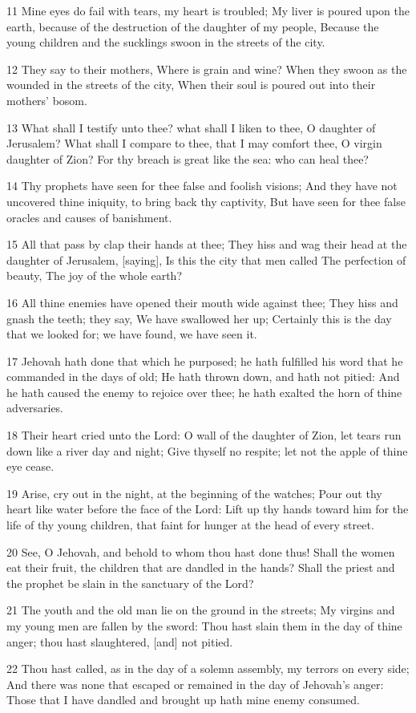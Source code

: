 \par 11 Mine eyes do fail with tears, my heart is troubled; My liver is poured upon the earth, because of the destruction of the daughter of my people, Because the young children and the sucklings swoon in the streets of the city.
\par 12 They say to their mothers, Where is grain and wine? When they swoon as the wounded in the streets of the city, When their soul is poured out into their mothers' bosom.
\par 13 What shall I testify unto thee? what shall I liken to thee, O daughter of Jerusalem? What shall I compare to thee, that I may comfort thee, O virgin daughter of Zion? For thy breach is great like the sea: who can heal thee?
\par 14 Thy prophets have seen for thee false and foolish visions; And they have not uncovered thine iniquity, to bring back thy captivity, But have seen for thee false oracles and causes of banishment.
\par 15 All that pass by clap their hands at thee; They hiss and wag their head at the daughter of Jerusalem, [saying], Is this the city that men called The perfection of beauty, The joy of the whole earth?
\par 16 All thine enemies have opened their mouth wide against thee; They hiss and gnash the teeth; they say, We have swallowed her up; Certainly this is the day that we looked for; we have found, we have seen it.
\par 17 Jehovah hath done that which he purposed; he hath fulfilled his word that he commanded in the days of old; He hath thrown down, and hath not pitied: And he hath caused the enemy to rejoice over thee; he hath exalted the horn of thine adversaries.
\par 18 Their heart cried unto the Lord: O wall of the daughter of Zion, let tears run down like a river day and night; Give thyself no respite; let not the apple of thine eye cease.
\par 19 Arise, cry out in the night, at the beginning of the watches; Pour out thy heart like water before the face of the Lord: Lift up thy hands toward him for the life of thy young children, that faint for hunger at the head of every street.
\par 20 See, O Jehovah, and behold to whom thou hast done thus! Shall the women eat their fruit, the children that are dandled in the hands? Shall the priest and the prophet be slain in the sanctuary of the Lord?
\par 21 The youth and the old man lie on the ground in the streets; My virgins and my young men are fallen by the sword: Thou hast slain them in the day of thine anger; thou hast slaughtered, [and] not pitied.
\par 22 Thou hast called, as in the day of a solemn assembly, my terrors on every side; And there was none that escaped or remained in the day of Jehovah's anger: Those that I have dandled and brought up hath mine enemy consumed.


